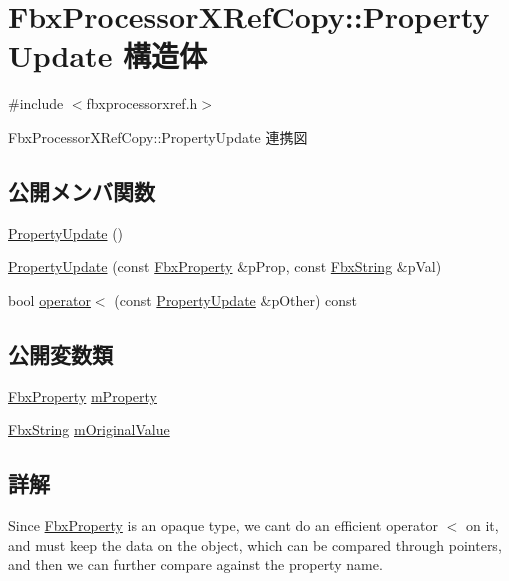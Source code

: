 \hypertarget{struct_fbx_processor_x_ref_copy_1_1_property_update}{}\section{Fbx\+Processor\+X\+Ref\+Copy\+:\+:Property\+Update 構造体}
\label{struct_fbx_processor_x_ref_copy_1_1_property_update}


{\ttfamily \#include $<$fbxprocessorxref.\+h$>$}



Fbx\+Processor\+X\+Ref\+Copy\+:\+:Property\+Update 連携図
\subsection*{公開メンバ関数}
\begin{DoxyCompactItemize}
\item 
\hyperlink{struct_fbx_processor_x_ref_copy_1_1_property_update_a43de8dde5acc6ca87ecd0260b1f268d3}{Property\+Update} ()
\item 
\hyperlink{struct_fbx_processor_x_ref_copy_1_1_property_update_abe945d76debd1b3f05d1d190814553a8}{Property\+Update} (const \hyperlink{class_fbx_property}{Fbx\+Property} \&p\+Prop, const \hyperlink{class_fbx_string}{Fbx\+String} \&p\+Val)
\item 
bool \hyperlink{struct_fbx_processor_x_ref_copy_1_1_property_update_a1fd30e51777d115cc68e217d7581ae64}{operator$<$} (const \hyperlink{struct_fbx_processor_x_ref_copy_1_1_property_update}{Property\+Update} \&p\+Other) const
\end{DoxyCompactItemize}
\subsection*{公開変数類}
\begin{DoxyCompactItemize}
\item 
\hyperlink{class_fbx_property}{Fbx\+Property} \hyperlink{struct_fbx_processor_x_ref_copy_1_1_property_update_a2e5c002f72c067c846ff3bf653273edf}{m\+Property}
\item 
\hyperlink{class_fbx_string}{Fbx\+String} \hyperlink{struct_fbx_processor_x_ref_copy_1_1_property_update_aed07d2bfbf3fa75b4fb33439e3ff62dd}{m\+Original\+Value}
\end{DoxyCompactItemize}


\subsection{詳解}
Since \hyperlink{class_fbx_property}{Fbx\+Property} is an opaque type, we can\textquotesingle{}t do an efficient operator $<$ on it, and must keep the data on the object, which can be compared through pointers, and then we can further compare against the property name. 

